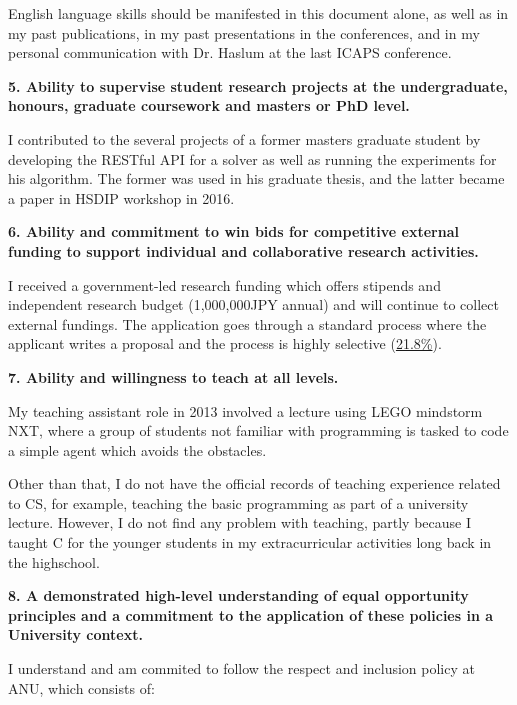 \documentclass[12pt]{article}
\begin{document}
English language skills should be manifested in this document alone, as
well as in my past publications, in my past presentations in the conferences,
and in my personal communication with Dr. Haslum at the last ICAPS conference.

\textbf{5. Ability to supervise student research projects at the
undergraduate, honours, graduate coursework and masters or PhD level.}

I contributed to the several projects of a former masters graduate student
by developing the RESTful API for a solver as well as running the
experiments for his algorithm. The former was used in his graduate thesis,
and the latter became a paper in HSDIP workshop in 2016.

\textbf{6. Ability and commitment to win bids for competitive external
funding to support individual and collaborative research activities.}

I received a government-led research funding which offers
stipends and independent research budget (1,000,000JPY annual) and will continue to collect external fundings.
The application goes through a standard process where the applicant writes 
a proposal and the process is highly selective (\href{https://www.jsps.go.jp/j-pd/pd_saiyo.html}{21.8\%}).

\textbf{7. Ability and willingness to teach at all levels.}

My teaching assistant role in 2013 involved a lecture using LEGO mindstorm NXT,
where a group of students not familiar with programming is tasked to code a simple
agent which avoids the obstacles.

Other than that, I do not have the official records of
teaching experience related to CS, for example, teaching the basic programming as part of a university lecture.
However, I do not find any problem with teaching,
partly because I taught C for the younger students in my extracurricular activities long back in the highschool.

\textbf{8. A demonstrated high-level understanding of equal opportunity
principles and a commitment to the application of these policies in a
University context.}

I understand and am commited to follow the respect and inclusion policy at ANU, which consists of:
\end{document}
